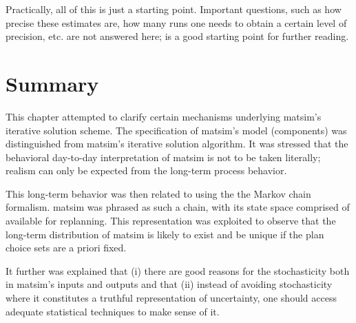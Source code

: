 Practically, all of this is just a starting point. Important questions,
such as how precise these estimates are, how many runs one needs to
obtain a certain level of precision, etc. are not answered here; 
\citet{ross-2006} is a good starting point for further reading. 


\section{\label{sec:Summary}Summary}

This chapter attempted to clarify certain mechanisms underlying \gls{matsim}'s
iterative solution scheme. The specification of \gls{matsim}'s model (components)
was distinguished from \gls{matsim}'s iterative solution algorithm. It was
stressed that the behavioral day-to-day interpretation of \gls{matsim} is
not to be taken literally; realism can only be expected from the long-term
process behavior.

This long-term behavior was then related to  using the the Markov chain
formalism.
\gls{matsim} was phrased as such a chain, with its state space comprised of
 available for replanning. This representation
was exploited to observe that the long-term distribution of \gls{matsim} is
likely to exist and be unique\corr{,}{} if the plan choice sets are a priori
fixed.

It further was explained that (i) there are good reasons for the stochasticity
both in \gls{matsim}'s inputs and outputs and that (ii) instead of avoiding
stochasticity where it constitutes a truthful representation of uncertainty,
one should access adequate statistical techniques to make sense of
it. 

